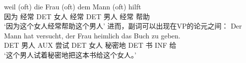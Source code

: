 \ea
\gll weil (oft) die Frau (oft) dem Mann (oft) hilft\\
	因为 \spacebr{}经常 DET 女人 \spacebr{}经常 DET 男人 \spacebr{}经常 帮助\\
\glt `因为这个女人经常帮助这个男人'
\z
进而，副词可以出现在VP的论元之间：
\ea
\gll Der Mann hat versucht, der Frau heimlich das Buch zu geben.\\
	DET 男人 AUX 尝试 DET 女人 秘密地 DET 书 INF 给\\
\glt `这个男人试着秘密地把这本书给这个女人。'
\z 

